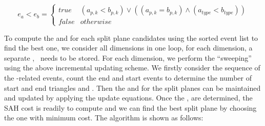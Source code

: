 \begin{equation} 
    e_{a} < e_{b} = \left\{ 
        \begin{array}{ll}
            true & (a_{p,k} < b_{p,k}) \vee ( (a_{p,k} = b_{p,k}) \wedge (a_{type} < b_{type}) ) \\
            false & otherwise
        \end{array} \right.
        \label{eq:EventCompare}   
\end{equation} 

To compute the \mynumtrileft and \mynumtriright for each split plane candidates  using the sorted event list to find the best one, we consider all dimensions in one loop, for each dimension, a separate , \ needs to be stored. For each dimension, we perform the ``sweeping'' using the above incremental updating scheme. We firstly consider the sequence of the -related events, count the end and start events to determine the number of start and end triangles  and . Then the \mynumtrileft and \mynumtriright for the split planes can be maintained and updated by applying the update equations. Once the \mynumtrileft, \mynumtriright are determined, the SAH cost is readily to compute and we can find the best split plane by choosing the one with minimum cost. The algorithm is shown as follows: 

